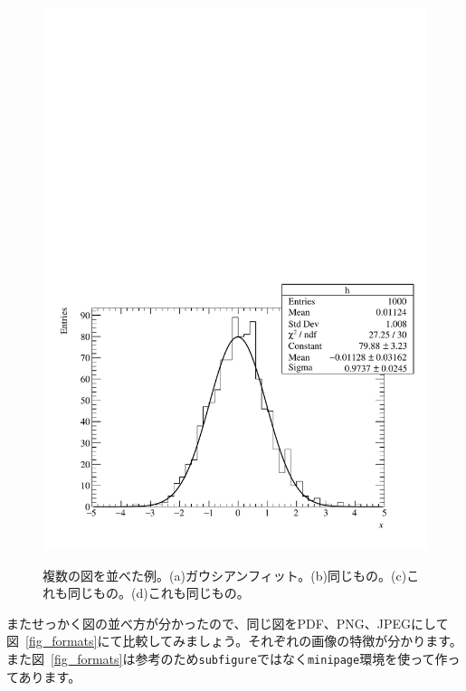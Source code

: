 \begin{figure}
{    \includegraphics[width=.5\textwidth,clip]{fig/histogram.pdf}%
    \label{fig_subfigure_c}%
  }%
  \caption[複数の図を並べた例]{複数の図を並べた例。(a)ガウシアンフィット。(b)同じもの。(c)これも同じもの。(d)これも同じもの。}
\label{fig_subfigure}
\end{figure}

またせっかく図の並べ方が分かったので、同じ図をPDF、PNG、JPEGにして図~\ref{fig_formats}にて比較してみましょう。それぞれの画像の特徴が分かります。また図~\ref{fig_formats}は参考のため\texttt{subfigure}ではなく\texttt{minipage}環境を使って作ってあります。

